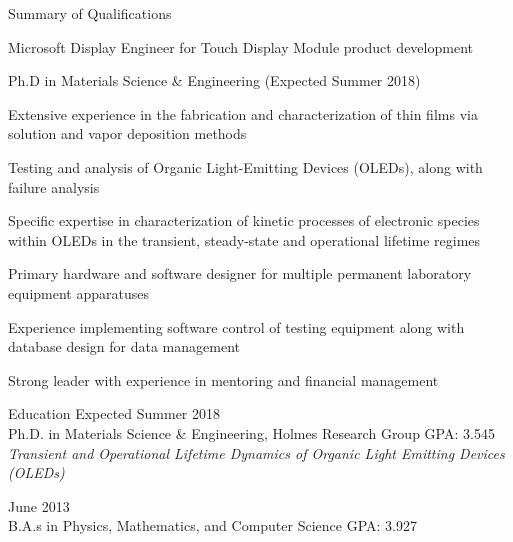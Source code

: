 \documentclass{resume} %
\begin{document}

\begin{rSection}{Summary of Qualifications}
\item Microsoft Display Engineer for Touch Display Module product development
\item Ph.D in Materials Science \& Engineering (Expected Summer 2018)
\item Extensive experience in the fabrication and characterization of thin films via solution and vapor deposition methods
\item Testing and analysis of Organic Light-Emitting Devices (OLEDs), along with failure analysis
\item Specific expertise in characterization of kinetic processes of electronic species within OLEDs in the transient, steady-state and operational lifetime regimes
\item Primary hardware and software designer for multiple permanent laboratory equipment apparatuses
\item Experience implementing software control of testing equipment along with database design for data management 
\item Strong leader with experience in mentoring and financial management 


\end{rSection}


\begin{rSection}{Education}
\hspace{-.5em}{\bf University of Minnesota} \hfill { Expected Summer 2018} \\
Ph.D. in Materials Science \& Engineering, Holmes Research Group \hfill GPA: 3.545\\
{\em Transient and Operational Lifetime Dynamics of Organic Light Emitting Devices (OLEDs)}\vspace{-1ex}

\hspace{-.5em}{\bf Coe College} \hfill { June 2013} \\ 
B.A.s in Physics, Mathematics, and Computer Science \hfill GPA: 3.927
\end{rSection}
\end{document}
